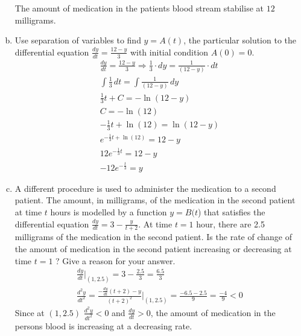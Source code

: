 \documentclass[11pt,letterpaper]{article}
\begin{document}
\begin{enumerate}[a.)]
The amount of medication in the patients blood stream stabilise at $12$ milligrams. 
\item Use separation of variables to find $y = A(t)$, the particular solution to the differential equation $\frac{dy}{dt}=\frac{12-y}{3}$ with initial condition $A(0) = 0$.
\begin{align*}
    \frac{dy}{dt}=\frac{12-y}{3} \Longrightarrow \frac{1}{3} \cdot dy= \frac{1}{(12-y)} \cdot dt \\
    \int \frac{1}{3} \, dt = \int \frac{1}{(12-y)} \, dy \\
    \frac{1}{3}t +C=-\ln(12-y) \\
    C=-\ln(12) \\ 
      -\frac{1}{3}t +\ln(12)=\ln(12-y) \\
      e^{ -\frac{1}{3}t +\ln(12)}=12-y\\
      12 e^{ -\frac{1}{3}t}=12-y\\
       -12 e^{ -\frac{t}{3}}=y
\end{align*}
\item A different procedure is used to administer the medication to a second patient. The amount, in milligrams, of the medication in the second patient at time $t$ hours is modelled by a function $y = B(t$) that satisfies the differential equation $\frac{dy}{dt}= 3-\frac{y}{t+2}$. At time $t = 1$ hour, there are 2.5 milligrams of the medication in
the second patient. Is the rate of change of the amount of medication in the second patient increasing or decreasing at time $t = 1$ ? Give a reason for your answer.
\begin{align*}
    \frac{dy}{dt}\biggr\rvert_{(1,2.5)} =3-\frac{2.5}{3} = \frac{6.5}{3}\\
    \frac{d^2y}{dt^2}= \frac{-\frac{dy}{dt}(t+2)-y}{(t+2)^2} \biggr\rvert_{(1,2.5)} = \frac{-6.5-2.5}{9} =\frac{-4}{9}<0
\end{align*}
Since at $(1,2.5)$ $\frac{d^2y}{dt^2}<0$ and $\frac{dy}{dt}>0$, the amount of medication in the persons blood is increasing at a decreasing rate. 
\end{enumerate}
\end{document}
